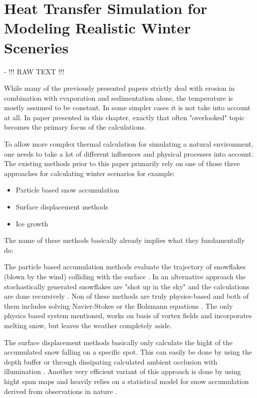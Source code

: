\section{Heat Transfer Simulation for Modeling Realistic Winter Sceneries}

\cite{benes2001layered} - !!! RAW TEXT !!!


While many of the previously presented papers strictly deal with erosion in combination with evaporation and sedimentation alone, the temperature is mostly assumed to be constant. In some simpler cases it is not take into account at all. In paper presented in this chapter, exactly that often "overlooked" topic becomes the primary focus of the calculations.

To allow more complex thermal calculation for simulating a natural environment, one needs to take a lot of different influences and physical processes into account. The existing methods prior to this paper primarily rely on one of those three approaches for calculating winter scenarios for example:
\begin{itemize}
	\item Particle based snow accumulation
	\item Surface displacement methods
	\item Ice growth
\end{itemize}

The name of these methods basically already implies what they fundamentally do:

The particle based accumulation methods evaluate the trajectory of snowflakes (blown by the wind) colliding with the surface \cite{nishita1997modeling}. In an alternative approach the stochastically generated snowflakes are "shot up in the sky" and the calculations are done recursively \cite{fearing2000computer}. Non of these methods are truly physics-based and both of them includes solving Navier-Stokes \cite{feldman2002modeling} or the Bolzmann equations \cite{wang2006real}. The only physics based system mentioned, works on basis of vortex fields and incorporates melting snow, but leaves the weather completely aside.

The surface displacement methods basically only calculate the hight of the accumulated snow falling on a specific spot. This can easily be done by using the depth buffer \cite{ohlsson2004real} or through dissipating calculated ambient occlusion with illumination \cite{foldes2007occlusion}. Another very efficient variant of this approach is done by using hight span maps and heavily relies on a statistical model for snow accumulation derived from observations in nature \cite{haglund2002snow} \cite{festenberg2009geometric}.

